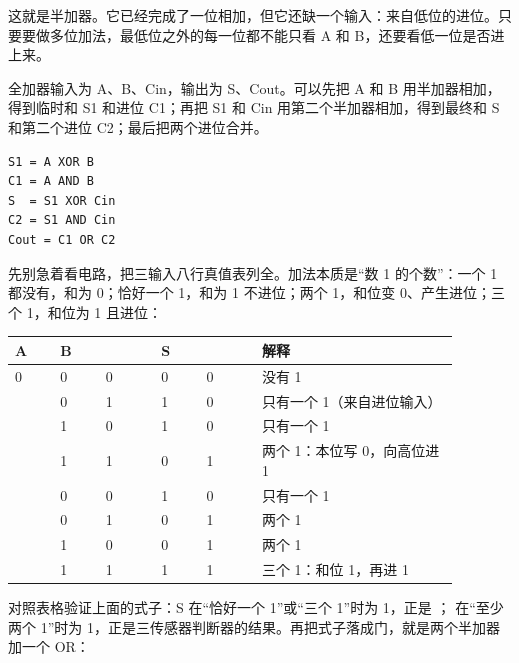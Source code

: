 这就是半加器。它已经完成了一位相加，但它还缺一个输入：来自低位的进位。只要要做多位加法，最低位之外的每一位都不能只看 A 和 B，还要看低一位是否进上来。

全加器输入为 A、B、Cin，输出为 S、Cout。可以先把 A 和 B 用半加器相加，得到临时和 S1 和进位 C1；再把 S1 和 Cin 用第二个半加器相加，得到最终和 S 和第二个进位 C2；最后把两个进位合并。

\begin{lstlisting}
S1 = A XOR B
C1 = A AND B
S  = S1 XOR Cin
C2 = S1 AND Cin
Cout = C1 OR C2
\end{lstlisting}

先别急着看电路，把三输入八行真值表列全。加法本质是“数 1 的个数”：一个 1 都没有，和为 0；恰好一个 1，和为 1 不进位；两个 1，和位变 0、产生进位；三个 1，和位为 1 且进位：

\begin{longtable}{L{0.09\linewidth}L{0.09\linewidth}L{0.11\linewidth}L{0.09\linewidth}L{0.11\linewidth}L{0.39\linewidth}}
\toprule
A & B &  & S &  & 解释 \\
 & 0 & 0 & 0 & 0 & 没有 1 \\ & 0 & 1 & 1 & 0 & 只有一个 1（来自进位输入） \\ & 1 & 0 & 1 & 0 & 只有一个 1 \\ & 1 & 1 & 0 & 1 & 两个 1：本位写 0，向高位进 1 \\ & 0 & 0 & 1 & 0 & 只有一个 1 \\ & 0 & 1 & 0 & 1 & 两个 1 \\ & 1 & 0 & 0 & 1 & 两个 1 \\ & 1 & 1 & 1 & 1 & 三个 1：和位 1，再进 1 \\
\bottomrule
\end{longtable}

对照表格验证上面的式子：S 在“恰好一个 1”或“三个 1”时为 1，正是 ； 在“至少两个 1”时为 1，正是三传感器判断器的结果。再把式子落成门，就是两个半加器加一个 OR：

